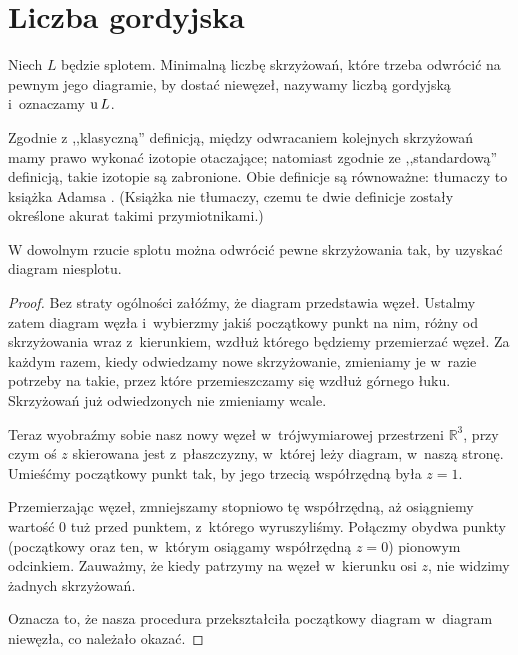 
\section{Liczba gordyjska}
%

\begin{definition}
    Niech $L$ będzie splotem.
    Minimalną liczbę skrzyżowań, które trzeba odwrócić na pewnym jego diagramie, by dostać niewęzeł, nazywamy liczbą gordyjską i~oznaczamy $\operatorname{u} L$.
\end{definition}

Zgodnie z ,,klasyczną'' definicją, między odwracaniem kolejnych skrzyżowań mamy prawo wykonać izotopie otaczające; natomiast zgodnie ze ,,standardową'' definicją, takie izotopie są zabronione.
Obie definicje są równoważne: tłumaczy to książka Adamsa \cite[s. 58]{adams1994}.
(Książka nie tłumaczy, czemu te dwie definicje zostały określone akurat takimi przymiotnikami.)

\begin{lemma}
\label{lem:unknotting_well_defined}%
    W dowolnym rzucie splotu można odwrócić pewne skrzyżowania tak, by uzyskać diagram niesplotu.
\end{lemma}

\begin{proof}
    Bez straty ogólności załóźmy, że diagram przedstawia węzeł.
    Ustalmy zatem diagram węzła i~wybierzmy jakiś początkowy punkt na nim, różny od skrzyżowania wraz z~kierunkiem, wzdłuż którego będziemy przemierzać węzeł.
    Za każdym razem, kiedy odwiedzamy nowe skrzyżowanie, zmieniamy je w~razie potrzeby na takie, przez które przemieszczamy się wzdłuż górnego łuku.
    Skrzyżowań już odwiedzonych nie zmieniamy wcale.

    Teraz wyobraźmy sobie nasz nowy węzeł w~trójwymiarowej przestrzeni $\mathbb R^3$, przy czym oś $z$ skierowana jest z~płaszczyzny, w~której leży diagram, w~naszą stronę.
    Umieśćmy początkowy punkt tak, by jego trzecią współrzędną była $z = 1$.

    Przemierzając węzeł, zmniejszamy stopniowo tę współrzędną, aż osiągniemy wartość $0$ tuż przed punktem, z~którego wyruszyliśmy.
    Połączmy obydwa punkty (początkowy oraz ten, w~którym osiągamy współrzędną $z = 0$) pionowym odcinkiem.
    Zauważmy, że kiedy patrzymy na węzeł w~kierunku osi $z$, nie widzimy żadnych skrzyżowań.

    Oznacza to, że nasza procedura przekształciła początkowy diagram w~diagram niewęzła, co należało okazać.
\end{proof}


